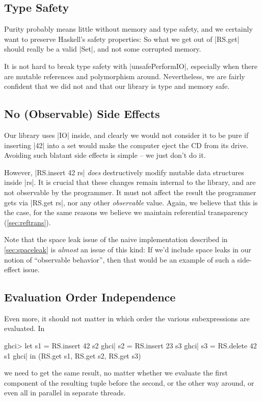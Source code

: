 \documentclass[manuscript,screen,acmsmall,nonacm]{acmart}
\begin{document}
\subsection{Type Safety}

Purity probably means little without memory and type safety, and we certainly want to preserve Haskell's safety properties: So what we get out of |RS.get| should really be a valid |Set|, and not some corrupted memory.

It is not hard to break type safety with |unsafePerformIO|, especially when there are mutable references and polymorphism around. Nevertheless, we are fairly confident that we did not and that our library is type and memory safe.

\subsection{No (Observable) Side Effects}

Our library uses |IO| inside, and clearly we would not consider it to be pure if inserting |42| into a set would make the computer eject the CD from its drive. Avoiding such blatant side effects is simple -- we just don't do it.

However, |RS.insert 42 rs| \emph{does} destructively modify mutable data structures inside |rs|. It is crucial that these changes remain internal to the library, and are not observable by the programmer. It must not affect the result the programmer gets via |RS.get rs|, nor any other \emph{observable} value. Again, we believe that this is the case, for the same reasons we believe we maintain referential transparency (\cref{sec:reftrans}).

Note that the space leak issue of the naive implementation described in \cref{sec:spaceleak} is \emph{almost} an issue of this kind: If we’d include space leaks in our notion of “observable behavior”, then that would be an example of such a side-effect issue.

\subsection{Evaluation Order Independence}

Even more, it should not matter in which order the various subexpressions are evaluated. In
\begin{code}
ghci>  let  s1 = RS.insert 42 s2
ghci|       s2 = RS.insert 23 s3
ghci|       s3 = RS.delete 42 s1
ghci|  in (RS.get s1, RS.get s2, RS.get s3)
\end{code}
we need to get the same result, no matter whether we evaluate the first component of the resulting tuple before the second, or the other way around, or even all in parallel in separate threads.
\end{document}
